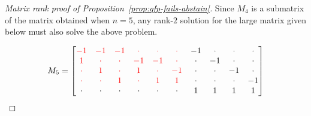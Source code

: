 \documentclass[anon]{colt2020} %
\begin{document}
\begin{proof}[Matrix rank proof of Proposition~\ref{prop:qfp-fails-abstain}]
	Since $M_4$ is a submatrix of the matrix obtained when $n=5$, any rank-$2$ solution for the large matrix given below must also solve the above problem.
	
	\[
	M_5 =
	\begin{bmatrix}
	{\color{red} -1} & {\color{red} -1} & {\color{red} -1} & {\color{red} \cdot} & {\color{red} \cdot} & {\color{red} \cdot} & -1 & \cdot & \cdot & \cdot \\
	{\color{red} 1} & {\color{red} \cdot} & {\color{red} \cdot} & {\color{red} -1} & {\color{red} -1} & {\color{red} \cdot} & \cdot & -1 & \cdot & \cdot \\
	{\color{red} \cdot} & {\color{red} 1} & {\color{red} \cdot} & {\color{red} 1} & {\color{red} \cdot} & {\color{red} -1} & \cdot & \cdot & -1 & \cdot \\
	{\color{red} \cdot} & {\color{red} \cdot} & {\color{red} 1} & {\color{red} \cdot} & {\color{red} 1} & {\color{red} 1} & \cdot & \cdot & \cdot & -1 \\
	\cdot & \cdot & \cdot & \cdot & \cdot & \cdot & 1 & 1 & 1 & 1\\
	\end{bmatrix}
	\]
	

\end{proof}
\end{document}
